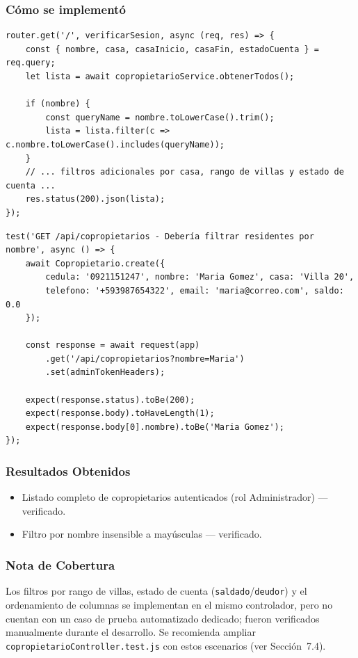 \documentclass[12pt,a4paper]{article}
\begin{document}
\subsubsection*{Cómo se implementó}

\begin{lstlisting}[caption={Filtro por nombre en \texttt{GET /api/copropietarios} (\texttt{src/presentation/controllers/copropietarioController.js})}]
router.get('/', verificarSesion, async (req, res) => {
    const { nombre, casa, casaInicio, casaFin, estadoCuenta } = req.query;
    let lista = await copropietarioService.obtenerTodos();

    if (nombre) {
        const queryName = nombre.toLowerCase().trim();
        lista = lista.filter(c => c.nombre.toLowerCase().includes(queryName));
    }
    // ... filtros adicionales por casa, rango de villas y estado de cuenta ...
    res.status(200).json(lista);
});
\end{lstlisting}

\begin{lstlisting}[caption={Prueba de integración con \texttt{supertest} (\texttt{copropietarioController.test.js})}]
test('GET /api/copropietarios - Debería filtrar residentes por nombre', async () => {
    await Copropietario.create({
        cedula: '0921151247', nombre: 'Maria Gomez', casa: 'Villa 20',
        telefono: '+593987654322', email: 'maria@correo.com', saldo: 0.0
    });

    const response = await request(app)
        .get('/api/copropietarios?nombre=Maria')
        .set(adminTokenHeaders);

    expect(response.status).toBe(200);
    expect(response.body).toHaveLength(1);
    expect(response.body[0].nombre).toBe('Maria Gomez');
});
\end{lstlisting}

\subsubsection*{Resultados Obtenidos}
\begin{itemize}[nosep]
    \item Listado completo de copropietarios autenticados (rol Administrador) — verificado.
    \item Filtro por nombre insensible a mayúsculas — verificado.
\end{itemize}

\subsubsection*{Nota de Cobertura}
Los filtros por rango de villas, estado de cuenta (\texttt{saldado}/\texttt{deudor}) y el
ordenamiento de columnas se implementan en el mismo controlador, pero no cuentan con un
caso de prueba automatizado dedicado; fueron verificados manualmente durante el desarrollo.
Se recomienda ampliar \texttt{copropietarioController.test.js} con estos escenarios (ver
Sección~7.4).
\end{document}
